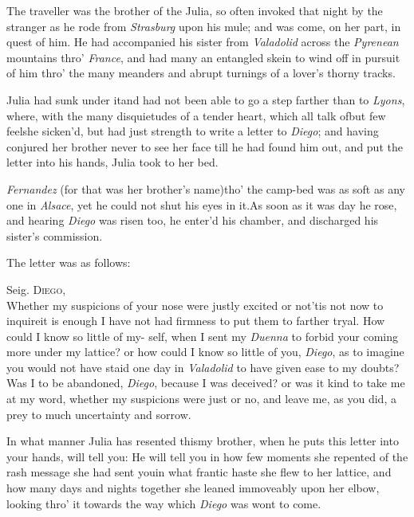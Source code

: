 \documentclass{article}
\begin{document}
The traveller was the brother of the Julia, so often
invoked that night by the stranger as he rode from \textit{Strasburg}
upon his mule; and was come, on her part,\break 
in quest of him. He had accompanied\break
his sister from \textit{Valadolid} across the
\textit{Pyrenean} mountains thro’ \textit{France}, and had many an
entangled skein to wind off in pursuit of him thro’ the many
meanders and abrupt turnings of a lover’s thorny tracks.

\tsk Julia had sunk under it\tsk and had
not been able to go a step farther than to \textit{Lyons}, where,
with the many disquietudes of a tender heart, which all talk
of\tsk but few feel\tsk she sicken’d, but had just
strength to write a letter to \textit{Diego}; and having conjured her
brother never to see her face till he had found him out, and put
the letter into his hands, Julia took to her bed.

\textit{Fernandez} (for that was her brother’s
name)\tsh tho’ the camp-bed was as soft as any one
in \textit{Alsace}, yet he could not shut his eyes in
it.\tsk As soon as it was day he rose, and hearing
\textit{Diego} was risen too, he enter’d his chamber, and discharged his
sister’s commission.

The letter was as follows:

\indent\quad Seig. \textsc{Diego},\\
\indent\lqq Whether my suspicions of your nose\break
\lqq were justly excited or not\tsk ’tis not now\break
\lqq to inquire\tsk it is enough I have not\break
\lqq had firmness to put them to farther\break
\lqq tryal.\break
\break
\indent\lqq How could I know so little of my-\break
\lqq self, when I sent my \textit{Duenna} to forbid\break
\lqq your coming more under my lattice?\break
\lqq or how could I know so little of you,\break
\lqq \textit{Diego}, as to imagine you would not\break
\lqq have staid one day in \textit{Valadolid} to have\break
\lqq given ease to my doubts?\tsk Was I to\break
\lqq be abandoned, \textit{Diego}, because I was\break
\lqq deceived? or was it kind to take me\break
\lqq at my word, whether my suspicions\break
\lqq were just or no, and leave me, as you\break
\lqq did, a prey to much uncertainty and\break
\lqq sorrow.

\indent\lqq In what manner Julia has resented\break
\lqq this\tsk my brother, when he puts this\break
\lqq letter into your hands, will tell you:\break
\lqq He will tell you in how few moments\break
\lqq she repented of the rash message she\break
\lqq had sent you\tsk in what frantic haste\break
\lqq she flew to her lattice, and how many\break
\lqq days and nights together she leaned\break
\lqq immoveably upon her elbow, looking\break
\lqq thro’ it towards the way which \textit{Diego}\break
\lqq was wont to come.\hfill
\end{document}
